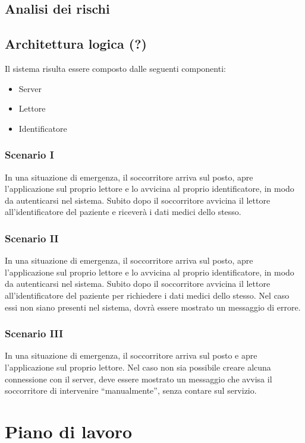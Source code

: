 \documentclass[a4paper,12pt]{report}
\begin{document}
\section{Analisi dei rischi}

\section{Architettura logica (?)}
Il sistema risulta essere composto dalle seguenti componenti:
\begin{itemize}
	\item Server
	\item Lettore
	\item Identificatore
\end{itemize}

\subsection{Scenario I}
In una situazione di emergenza, il soccorritore arriva sul posto, apre l'applicazione sul proprio lettore e lo avvicina al proprio identificatore, in modo da autenticarsi nel sistema. Subito dopo il soccorritore avvicina il lettore all'identificatore del paziente e riceverà i dati medici dello stesso. 
\subsection{Scenario II}
In una situazione di emergenza, il soccorritore arriva sul posto, apre l'applicazione sul proprio lettore e lo avvicina al proprio identificatore, in modo da autenticarsi nel sistema. Subito dopo il soccorritore avvicina il lettore all'identificatore del paziente per richiedere i dati medici dello stesso. Nel caso essi non siano presenti nel sistema, dovrà essere mostrato un messaggio di errore.
\subsection{Scenario III} 
In una situazione di emergenza, il soccorritore arriva sul posto e apre l'applicazione sul proprio lettore. Nel caso non sia possibile creare alcuna connessione con il server, deve essere mostrato un messaggio che avvisa il soccorritore di intervenire ``manualmente'', senza contare sul servizio.



\chapter{Piano di lavoro}
\end{document}
